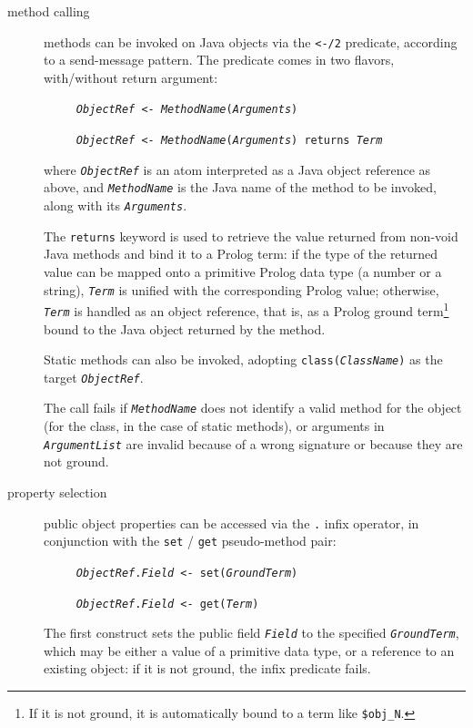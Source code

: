 \begin{description}
  \item [method calling]
        methods can be invoked on Java objects via the \texttt{<-/2} predicate,
        according to a send-message pattern. The predicate comes in two flavors, with/without return argument:

        \texttt{~~~~~\textit{ObjectRef} <- \textit{MethodName}(\textit{Arguments})}

        \texttt{~~~~~\textit{ObjectRef} <- \textit{MethodName}(\textit{Arguments})
                returns \textit{Term}}

        where \texttt{\textit{ObjectRef}} is an atom interpreted as a Java object
        reference as above, and \texttt{\textit{MethodName}} is the Java name of the method to be invoked, along with its \texttt{\textit{Arguments}}.

        The \texttt{returns} keyword is used to retrieve the value returned from non-void Java methods and bind it to a Prolog term: if the type of the returned value can be mapped onto a primitive Prolog data type (a number or a string), \texttt{\textit{Term}} is unified with the corresponding Prolog value; otherwise, \texttt{\textit{Term}} is handled as an object reference, that is, as a Prolog ground term\footnote{If it is not ground, it is automatically bound to a term like \texttt{\$obj\_N}.} bound to the Java object returned by the method.

        Static methods can also be invoked, adopting \texttt{class(\textit{ClassName})} as the target \texttt{\textit{ObjectRef}}.

        The call fails if \texttt{\textit{MethodName}} does not identify a valid method for the object (for the class, in the case of static methods), or arguments in \texttt{\textit{ArgumentList}} are invalid because of a wrong signature or because they are not ground.

  \item [property selection]
        public object properties can be accessed via the \texttt{.} infix operator, in conjunction with the \texttt{set} / \texttt{get} pseudo-method pair:

        \texttt{~~~~~\textit{ObjectRef}.\textit{Field} <- set(\textit{GroundTerm})}

        \texttt{~~~~~\textit{ObjectRef}.\textit{Field} <- get(\textit{Term})}

        The first construct sets the public field \texttt{\textit{Field}} to the specified \texttt{\textit{GroundTerm}}, which may be either a value of a primitive data type, or a reference to an existing object: if it is not ground, the infix predicate fails.


\end{description}
